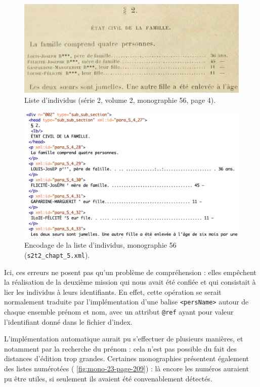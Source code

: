 \begin{figure}[h]
    \centering
    \includegraphics[width=14cm]{img/mono-56-page-4.jpg}
    \caption[Liste d'individus au début du paragraphe 2 (\no{} 56)]{Liste d'individus (série 2, volume 2, monographie \no{} 56, page 4).}
    \label{fig:mono-56-page-4}
\end{figure}

\begin{figure}[h]
    \includegraphics[width=14cm]{img/mono-56-page-4-code.png}
    \caption[Encodage de la liste d'individus (\no{} 56)]{Encodage de la liste d'individus, monographie \no{} 56 (\texttt{s2t2\_chapt\_5.xml}).}
    \label{fig:mono-56-page-4-code}
\end{figure}

Ici, ces erreurs ne posent pas qu'un problème de compréhension : elles empêchent la réalisation de la deuxième mission qui nous avait été confiée et qui consistait à lier les individus à leurs identifiants. En effet, cette opération se serait normalement traduite par l'implémentation d'une balise \texttt{<persName>} autour de chaque ensemble prénom et nom, avec un attribut \texttt{@ref} ayant pour valeur l'identifiant donné dans le fichier d'index.

L'implémentation automatique aurait pu s'effectuer de plusieurs manières, et notamment par la recherche du prénom : cela n'est pas possible du fait des distances d'édition trop grandes. Certaines monographies présentent également des listes numérotées (\fig{} \ref{fig:mono-23-page-209}) : là encore les numéros auraient pu être utiles, si seulement ils avaient été convenablement détectés.

